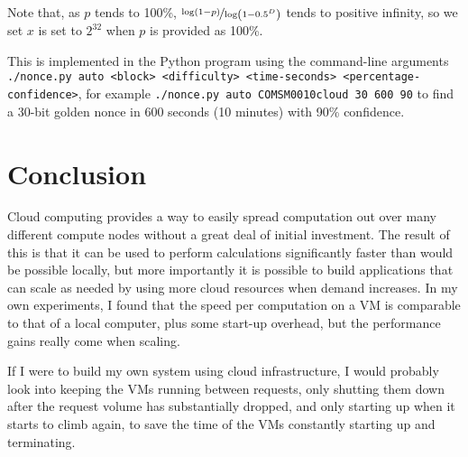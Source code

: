\documentclass[letterpaper,twocolumn,11pt]{article}
\begin{document}
Note that, as $p$ tends to 100\%, $\nicefrac{\log\left(1-p\right)}{\log\left(1-0.5^D\right)}$ tends to positive infinity, so we set $x$ is set to $2^{32}$ when $p$ is provided as 100\%.

This is implemented in the Python program using the command-line arguments \texttt{./nonce.py auto <block> <difficulty> <time-seconds> <percentage-confidence>}, for example \verb|./nonce.py auto COMSM0010cloud 30 600 90| to find a 30-bit golden nonce in 600 seconds (10 minutes) with 90\% confidence.

\section{Conclusion}

Cloud computing provides a way to easily spread computation out over many different compute nodes without a great deal of initial investment. The result of this is that it can be used to perform calculations significantly faster than would be possible locally, but more importantly it is possible to build applications that can scale as needed by using more cloud resources when demand increases. In my own experiments, I found that the speed per computation on a VM is comparable to that of a local computer, plus some start-up overhead, but the performance gains really come when scaling.

If I were to build my own system using cloud infrastructure, I would probably look into keeping the VMs running between requests, only shutting them down after the request volume has substantially dropped, and only starting up when it starts to climb again, to save the time of the VMs constantly starting up and terminating.
\end{document}
